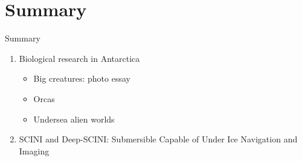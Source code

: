\documentclass{beamer}
\begin{document}
\section{Summary}

\begin{frame}{Summary}
\begin{enumerate}
\item Biological research in Antarctica
\begin{itemize}
\item Big creatures: photo essay
\item Orcas
\item Undersea alien worlds
\end{itemize}
\item SCINI and Deep-SCINI: Submersible Capable of Under Ice Navigation and Imaging
\end{enumerate}
\end{frame}
\end{document}
